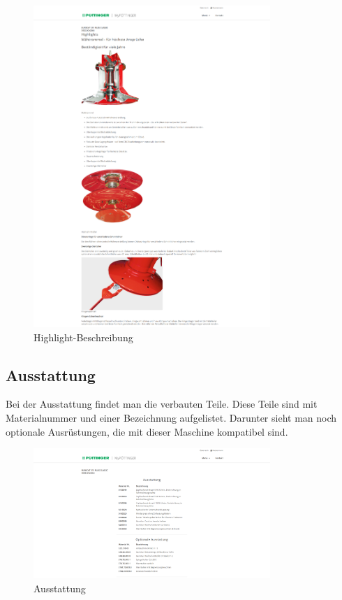 \begin{figure}[H]
	\centerline{
		\includegraphics[width=0.8\textwidth]{./grafiken/erm_detailansicht_highlights_beschreibung.PNG}
	}
	\vskip0pt
	\caption{Highlight-Beschreibung} \label{fig:highlightbeschreibung}
\end{figure}

\subsection{Ausstattung}

Bei der Ausstattung findet man die verbauten Teile. Diese Teile sind mit Materialnummer und einer Bezeichnung aufgelistet. Darunter sieht man noch optionale Ausrüstungen, die mit dieser Maschine kompatibel sind.

\begin{figure}[H]
	\centerline{
		\includegraphics[width=0.8\textwidth]{./grafiken/erm_detailansicht_ausstattung.PNG}
	}
	\vskip0pt
	\caption{Ausstattung} \label{fig:ausstattung}
\end{figure}

